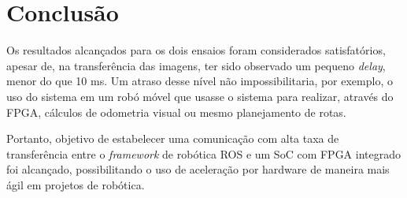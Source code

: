 \chapter{Conclusão}\label{cap:conclusao}

Os resultados alcançados para os dois ensaios foram considerados satisfatórios, apesar de, na transferência das imagens, ter sido observado um pequeno \textit{delay}, menor do que 10 ms. Um atraso desse nível não impossibilitaria, por exemplo, o uso do sistema em um robó móvel que usasse o sistema para realizar, através do FPGA, cálculos de odometria visual ou mesmo planejamento de rotas. 

Portanto,  objetivo de estabelecer uma comunicação com alta taxa de transferência entre o \textit{framework} de robótica ROS e um SoC com FPGA integrado foi alcançado, possibilitando o uso de aceleração por hardware de maneira mais ágil em projetos de robótica.
